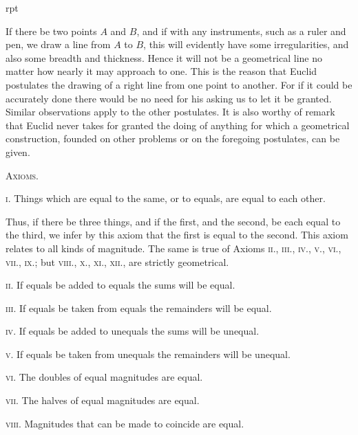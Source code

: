 \documentclass[oneside]{book}
\newcommand\imgflow[3]{
\setcounter{wrapwidth}{#1}
\begin{wrapfigure}[#2]{r}{\value{wrapwidth}pt}
\begin{center}
\vspace{-0.3in}
\end{center}
\end{wrapfigure}
}
\begin{document}
\imgflow{100}{3}{f010}
\begin{footnotesize}
If there be two points $A$ and $B$, and if with any instruments,
such as a ruler and pen, we draw a line
from $A$ to $B$, this will evidently have some
irregularities, and also some breadth and
thickness. Hence it will not be a geometrical line no matter how
nearly it may approach to one. This is the reason that Euclid
postulates the drawing of a right line from one point to another.
For if it could be accurately done there would be no need for his
asking us to let it be granted. Similar observations apply to the
other postulates. It is also worthy of remark that Euclid never
takes for granted the doing of anything for which a geometrical
construction, founded on other problems or on the foregoing postulates,
can be given.
\par\end{footnotesize}


\begin{center}
\textsc{Axioms.}
\end{center}

\textsc{i}. Things which are equal to the same, or to equals,
are equal to each other.

\begin{footnotesize}
Thus, if there be three things, and if the first, and the second,
be each equal to the third, we infer by this axiom that the first is
equal to the second. This axiom relates to all kinds of magnitude.
The same is true of Axioms \textsc{ii}., \textsc{iii}., \textsc{iv}., \textsc{v}., \textsc{vi}., \textsc{vii}., \textsc{ix}.;
but \textsc{viii}., \textsc{x}., \textsc{xi}., \textsc{xii}., are strictly geometrical.
\par\end{footnotesize}

\textsc{ii}. If equals be added to equals the sums will be
equal.

\textsc{iii}. If equals be taken from equals the remainders
will be equal.

\textsc{iv}. If equals be added to unequals the sums will be
unequal.

\textsc{v}. If equals be taken from unequals the remainders
will be unequal.

\textsc{vi}. The doubles of equal magnitudes are equal.

\textsc{vii}. The halves of equal magnitudes are equal.

\textsc{viii}. Magnitudes that can be made to coincide are
equal.
\end{document}
